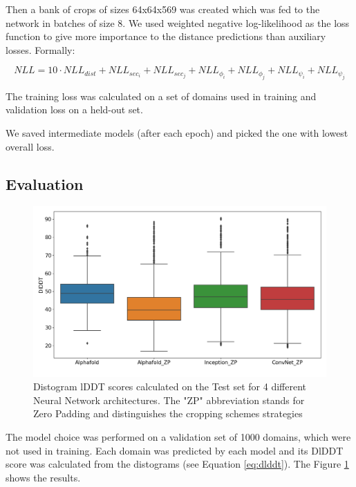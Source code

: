 Then a bank of crops of sizes 64x64x569 was created which was fed to the network in batches of size 8. We used weighted negative log-likelihood as the loss function to give more importance to the distance predictions than auxiliary losses. Formally:

\begin{equation}
    NLL = 10 \cdot NLL_{dist} + NLL_{sec_i} + NLL_{sec_j} + NLL_{\phi_i} + NLL_{\phi_j} + NLL_{\psi_i} + NLL_{\psi_j}
    \label{eq:NLLloss}
\end{equation}

The training loss was calculated on a set of domains used in training and validation loss on a held-out set. 

We saved intermediate models (after each epoch) and picked the one with lowest overall loss. 

\subsection{Evaluation}

\begin{figure}
    \centering
    \includegraphics[width=\linewidth]{imgs_tomas/models_lddt_nice.png}
    \caption{Distogram lDDT scores calculated on the Test set for 4 different Neural Network architectures. The "ZP" abbreviation stands for Zero Padding and distinguishes the cropping schemes strategies}
    \label{fig:models_lddt}
\end{figure}

The model choice was performed on a validation set of 1000 domains, which were not used in training. 
Each domain was predicted by each model and its DlDDT score was calculated from the distograms (see Equation \ref{eq:dlddt}). 
The Figure \ref{fig:models_lddt} shows the results. 

